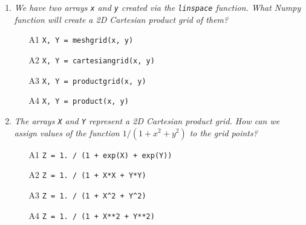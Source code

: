 \begin{enumerate}
\begin{enumerate}
\begin{Verbatim}[commandchars=\\\{\}]
\PY{n}{legend}\PY{p}{(}\PY{p}{)}
\PY{n}{show}\PY{p}{(}\PY{p}{)}
\end{Verbatim}
\item[A4] 
\begin{Verbatim}[commandchars=\\\{\}]
\PY{k+kn}{from} \PY{n+nn}{numpy} \PY{k+kn}{import} \PY{o}{*}
\PY{k+kn}{from} \PY{n+nn}{pylab} \PY{k+kn}{import} \PY{o}{*}
\PY{n}{x} \PY{o}{=} \PY{n}{linspace}\PY{p}{(}\PY{l+m+mi}{0}\PY{p}{,} \PY{n}{pi}\PY{p}{,} \PY{l+m+mi}{100}\PY{p}{)}
\PY{n}{y} \PY{o}{=} \PY{n}{cos}\PY{p}{(}\PY{n}{x}\PY{p}{)}
\PY{n}{axis}\PY{o}{=}\PY{p}{(}\PY{l+s}{"}\PY{l+s}{equal}\PY{l+s}{"}\PY{p}{)}
\PY{n}{clf}\PY{p}{(}\PY{p}{)}
\PY{n}{plot}\PY{p}{(}\PY{n}{x}\PY{p}{,} \PY{n}{y}\PY{p}{,} \PY{l+s}{'}\PY{l+s}{b--}\PY{l+s}{'}\PY{p}{,} \PY{n}{label}\PY{o}{=}\PY{l+s}{"}\PY{l+s}{cos(x)}\PY{l+s}{"}\PY{p}{)}
\PY{n}{legend}\PY{p}{(}\PY{p}{)}
\PY{n}{show}\PY{p}{(}\PY{p}{)}
\end{Verbatim}
\end{enumerate}

\vspace{6mm}

\item {\em We have two arrays {\tt x} and {\tt y} created via the {\tt linspace} function. What 
Numpy function will create a 2D Cartesian product grid of them?}\\

\begin{enumerate}
\item[A1] {\tt X, Y  = meshgrid(x, y)}
\item[A2] {\tt X, Y  = cartesiangrid(x, y)}
\item[A3] {\tt X, Y  = productgrid(x, y)}
\item[A4] {\tt X, Y  = product(x, y)}
\end{enumerate}

\vspace{6mm}

\item {\em The arrays {\tt X} and {\tt Y} represent a 2D Cartesian product grid. How can we
assign values of the function $1 / (1 + x^2 + y^2)$ to the grid points?}\\

\begin{enumerate}
\item[A1] {\tt Z = 1. / (1 + exp(X) + exp(Y))}
\item[A2] {\tt Z = 1. / (1 + X*X + Y*Y)}
\item[A3] {\tt Z = 1. / (1 + X\^{}2 + Y\^{}2)}
\item[A4] {\tt Z = 1. / (1 + X**2 + Y**2)}
\end{enumerate}


\end{enumerate}
